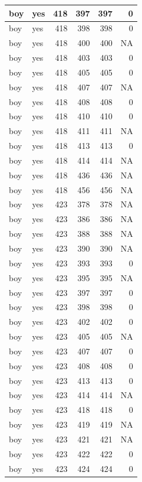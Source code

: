\documentclass[man]{apa6}
\begin{document}
\begin{tabular}{l|l|r|r|r|r}
\hline
boy & yes & 418 & 397 & 397 & 0\\
\hline
boy & yes & 418 & 398 & 398 & 0\\
\hline
boy & yes & 418 & 400 & 400 & NA\\
\hline
boy & yes & 418 & 403 & 403 & 0\\
\hline
boy & yes & 418 & 405 & 405 & 0\\
\hline
boy & yes & 418 & 407 & 407 & NA\\
\hline
boy & yes & 418 & 408 & 408 & 0\\
\hline
boy & yes & 418 & 410 & 410 & 0\\
\hline
boy & yes & 418 & 411 & 411 & NA\\
\hline
boy & yes & 418 & 413 & 413 & 0\\
\hline
boy & yes & 418 & 414 & 414 & NA\\
\hline
boy & yes & 418 & 436 & 436 & NA\\
\hline
boy & yes & 418 & 456 & 456 & NA\\
\hline
boy & yes & 423 & 378 & 378 & NA\\
\hline
boy & yes & 423 & 386 & 386 & NA\\
\hline
boy & yes & 423 & 388 & 388 & NA\\
\hline
boy & yes & 423 & 390 & 390 & NA\\
\hline
boy & yes & 423 & 393 & 393 & 0\\
\hline
boy & yes & 423 & 395 & 395 & NA\\
\hline
boy & yes & 423 & 397 & 397 & 0\\
\hline
boy & yes & 423 & 398 & 398 & 0\\
\hline
boy & yes & 423 & 402 & 402 & 0\\
\hline
boy & yes & 423 & 405 & 405 & NA\\
\hline
boy & yes & 423 & 407 & 407 & 0\\
\hline
boy & yes & 423 & 408 & 408 & 0\\
\hline
boy & yes & 423 & 413 & 413 & 0\\
\hline
boy & yes & 423 & 414 & 414 & NA\\
\hline
boy & yes & 423 & 418 & 418 & 0\\
\hline
boy & yes & 423 & 419 & 419 & NA\\
\hline
boy & yes & 423 & 421 & 421 & NA\\
\hline
boy & yes & 423 & 422 & 422 & 0\\
\hline
boy & yes & 423 & 424 & 424 & 0\\

\end{tabular}
\end{document}

